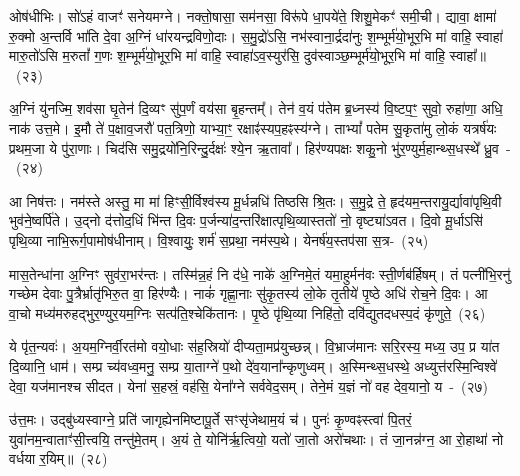 ओष॑धीभिः। सो॑\-ऽहं वाजꣳ॑ सनेयमग्ने। नक्तो॒षासा॒ सम॑नसा॒ विरू॑पे धा॒पये॑ते॒ शिशु॒मेकꣳ॑ समी॒ची। द्यावा॒ क्षामा॑ रु॒क्मो अ॒न्तर्वि भा॑ति दे॒वा अ॒ग्निं धा॑रयन्द्रविणो॒दाः। स॒मु॒द्रो॑\-ऽसि॒ नभ॑स्वाना॒र्द्रदा॑नुः श॒म्भूर्म॑यो॒भूर॒भि मा॑ वाहि॒ स्वाहा॑ मारु॒तो॑\-ऽसि म॒रुतां᳚ ग॒णः श॒म्भूर्म॑यो॒भूर॒भि मा॑ वाहि॒ स्वाहा॑\-ऽ\-व॒स्युर॑सि॒ दुव॑स्वाञ्छ॒म्भूर्म॑यो॒भूर॒भि मा॑ वाहि॒ स्वाहा᳚॥~(२३)\ip

{\anuvakamend[{धने᳚ष्व॒पो दुव॑स्वाञ्छ॒म्भूर्म॑यो॒भूर॒भि मा॒ द्वे च॑}]}%

अ॒ग्निं यु॑नज्मि॒ शव॑सा घृ॒तेन॑ दि॒व्यꣳ सु॑प॒र्णं वय॑सा बृ॒हन्तम्᳚। तेन॑ व॒यं प॑तेम ब्र॒ध्नस्य॑ वि॒ष्टप॒ꣳ॒ सुवो॒ रुहा॑णा॒ अधि॒ नाक॑ उत्त॒मे। इ॒मौ ते॑ प॒क्षाव॒जरौ॑ पत॒त्रिणो॒ याभ्या॒ꣳ॒ रक्षाꣴ॑स्यप॒हꣴस्य॑ग्ने। ता\-भ्यां᳚ पतेम सु॒कृता॑मु लो॒कं यत्रर्\mbox{}ष॑यः प्रथम॒जा ये पु॑रा॒णाः। चिद॑सि समु॒द्रयो॑नि॒रिन्दु॒र्दक्षः॑ श्ये॒न ऋ॒तावा᳚। हिर॑ण्यपक्षः शकु॒नो भु॑र॒ण्युर्म॒हान्थ्स॒धस्थे᳚ ध्रु॒व~-~(२४)\ip

आ निष॑त्तः। नम॑स्ते अस्तु॒ मा मा॑ हिꣳसी॒र्विश्व॑स्य मू॒र्धन्नधि॑ तिष्ठसि श्रि॒तः। स॒मु॒द्रे ते॒ हृद॑यम॒न्तरायु॒र्द्यावा॑\-पृथि॒वी भुव॑ने॒ष्वर्पि॑ते। उ॒द्नो द॑त्तोद॒धिं भि॑न्त दि॒वः प॒र्जन्या॑\-द॒न्त\-रि॑क्षात्पृथि॒व्यास्ततो॑ नो॒ वृष्ट्या॑\-ऽ\-वत। दि॒वो मू॒र्धा\-ऽ\-सि॑ पृथि॒व्या नाभि॒रूर्ग॒पामोष॑धीनाम्। वि॒श्वायुः॒ शर्म॑ स॒प्रथा॒ नम॑स्प॒थे। येनर्\mbox{}ष॑य॒स्तप॑सा स॒त्र-~(२५)\ip

मास॒तेन्धा॑ना अ॒ग्निꣳ सुव॑रा॒भर॑न्तः। तस्मि॑न्न॒हं नि द॑धे॒ नाके॑ अ॒ग्निमे॒तं यमा॒हुर्मन॑वः स्ती॒र्णब॑र्\mbox{}हिषम्। तं पत्नी॑भि॒रनु॑ गच्छेम देवाः पु॒त्रैर्भ्रातृ॑भिरु॒त वा॒ हिर॑ण्यैः। नाकं॑ गृह्णा॒नाः सु॑कृ॒तस्य॑ लो॒के तृ॒तीये॑ पृ॒ष्ठे अधि॑ रोच॒ने दि॒वः। आ वा॒चो मध्य॑मरुहद्भुर॒ण्युर॒यम॒ग्निः सत्प॑ति॒श्चेकि॑तानः। पृ॒ष्ठे पृ॑थि॒व्या निहि॑तो॒ दवि॑द्युतदधस्प॒दं कृ॑णुते॒~(२६)\ip

ये पृ॑त॒न्यवः॑। अ॒यम॒ग्निर्वी॒रत॑मो वयो॒धाः स॑ह॒स्रियो॑ दीप्यता॒मप्र॑युच्छन्न्। वि॒भ्राज॑मानः सरि॒रस्य॒ मध्य॒ उप॒ प्र या॑त दि॒व्यानि॒ धाम॑। सम्प्र च्य॑वध्व॒मनु॒ सम्प्र या॒ताग्ने॑ प॒थो दे॑व॒याना᳚न्कृणुध्वम्। अ॒स्मिन्थ्स॒धस्थे॒ अध्युत्त॑रस्मि॒न्विश्वे॑ देवा॒ यज॑मानश्च सीदत। येना॑ स॒हस्रं॒ वह॑सि॒ येना᳚ग्ने सर्ववेद॒सम्। तेने॒मं य॒ज्ञं नो॑ वह देव॒यानो॒ य~-~(२७)\ip

उ॑त्त॒मः। उद्बु॑ध्यस्वाग्ने॒ प्रति॑ जागृह्येनमिष्टापू॒र्ते सꣳसृ॑जेथाम॒यं च॑। पुनः॑ कृ॒ण्वꣴस्त्वा॑ पि॒तरं॒ युवा॑नम॒न्वाताꣳ॑सी॒त्त्वयि॒ तन्तु॑मे॒तम्। अ॒यं ते॒ योनि॑र्\mbox{}ऋ॒त्वियो॒ यतो॑ जा॒तो अरो॑चथाः। तं जा॒नन्न॑ग्न॒ आ रो॒हाथा॑ नो वर्धया र॒यिम्॥~(२८)\ip

{\anuvakamend[{ध्रु॒वः स॒त्रं कृ॑णुते॒ यः स॒प्तत्रिꣳ॑शच्च}]}%

